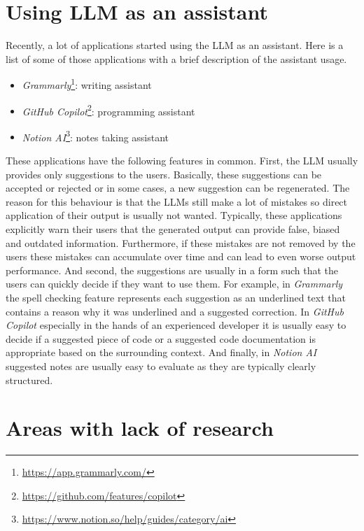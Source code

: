 \section*{Using LLM as an assistant}
\label{section:llm_as_an_assistant}

Recently, a lot of applications started using the LLM as an assistant. Here is a list of some of those applications with a brief description of the assistant usage.

\begin{itemize}
\item \textit{Grammarly}\footnote{\url{https://app.grammarly.com/}}: writing assistant
\item \textit{GitHub Copilot}\footnote{\url{https://github.com/features/copilot}}: programming assistant
\item \textit{Notion AI}\footnote{\url{https://www.notion.so/help/guides/category/ai}}: notes taking assistant
\end{itemize}

These applications have the following features in common. First, the LLM usually provides only suggestions to the users. Basically, these suggestions can be accepted or rejected or in some cases, a new suggestion can be regenerated. The reason for this behaviour is that the LLMs still make a lot of mistakes so direct application of their output is usually not wanted. Typically, these applications explicitly warn their users that the generated output can provide false, biased and outdated information. Furthermore, if these mistakes are not removed by the users these mistakes can accumulate over time and can lead to even worse output performance. And second, the suggestions are usually in a form such that the users can quickly decide if they want to use them. For example, in \textit{Grammarly} the spell checking feature represents each suggestion as an underlined text that contains a reason why it was underlined and a suggested correction. In \textit{GitHub Copilot} especially in the hands of an experienced developer it is usually easy to decide if a suggested piece of code or a suggested code documentation is appropriate based on the surrounding context. And finally, in \textit{Notion AI} suggested notes are usually easy to evaluate as they are typically clearly structured.


\section*{Areas with lack of research}

